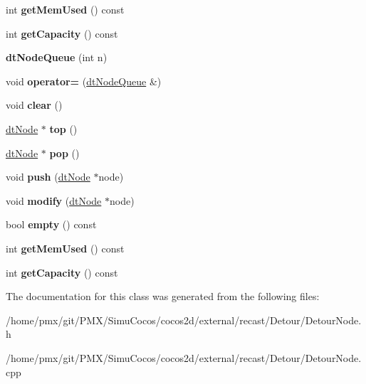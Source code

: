 \begin{DoxyCompactItemize}
int {\bfseries get\+Mem\+Used} () const
\item 
\mbox{\label{classdtNodeQueue_a3bd1e5d3450e90384d8d8ce7f59080de}} 
int {\bfseries get\+Capacity} () const
\item 
\mbox{\label{classdtNodeQueue_a98462fc76364861576fa8547987d5458}} 
{\bfseries dt\+Node\+Queue} (int n)
\item 
\mbox{\label{classdtNodeQueue_a11d772df68288a5d6b4eecdd74141227}} 
void {\bfseries operator=} (\hyperlink{classdtNodeQueue}{dt\+Node\+Queue} \&)
\item 
\mbox{\label{classdtNodeQueue_aa0f83a0d1f38b0b97fb549d1372c8be7}} 
void {\bfseries clear} ()
\item 
\mbox{\label{classdtNodeQueue_ad76eefdf18096e14f67c579c20a506af}} 
\hyperlink{structdtNode}{dt\+Node} $\ast$ {\bfseries top} ()
\item 
\mbox{\label{classdtNodeQueue_a4fa10be8cbf65dcdf2284f18a3e949d3}} 
\hyperlink{structdtNode}{dt\+Node} $\ast$ {\bfseries pop} ()
\item 
\mbox{\label{classdtNodeQueue_a76d83f497e1a5bcf72a6cc902a696a2a}} 
void {\bfseries push} (\hyperlink{structdtNode}{dt\+Node} $\ast$node)
\item 
\mbox{\label{classdtNodeQueue_a8be783bde0911bdf92503a2e111f2a1a}} 
void {\bfseries modify} (\hyperlink{structdtNode}{dt\+Node} $\ast$node)
\item 
\mbox{\label{classdtNodeQueue_a15693f0c97c5d9a32cd0302cdcafd27c}} 
bool {\bfseries empty} () const
\item 
\mbox{\label{classdtNodeQueue_a024e0d15d235157f79bd6a386e090804}} 
int {\bfseries get\+Mem\+Used} () const
\item 
\mbox{\label{classdtNodeQueue_a3bd1e5d3450e90384d8d8ce7f59080de}} 
int {\bfseries get\+Capacity} () const
\end{DoxyCompactItemize}


The documentation for this class was generated from the following files\+:\begin{DoxyCompactItemize}
\item 
/home/pmx/git/\+P\+M\+X/\+Simu\+Cocos/cocos2d/external/recast/\+Detour/Detour\+Node.\+h\item 
/home/pmx/git/\+P\+M\+X/\+Simu\+Cocos/cocos2d/external/recast/\+Detour/Detour\+Node.\+cpp\end{DoxyCompactItemize}
